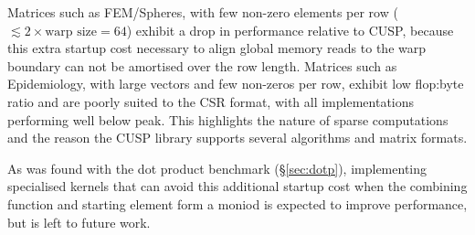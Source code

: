 %

Matrices such as FEM/Spheres, with few non-zero elements per row ($\lesssim 2
\times \text{warp size} = 64$) exhibit a drop in performance relative to CUSP,
because this extra startup cost necessary to align global memory reads to the
warp boundary can not be amortised over the row length.
%
Matrices such as Epidemiology, with large vectors and few non-zeros per row,
exhibit low flop:byte ratio and are poorly suited to the CSR format, with all
implementations performing well below peak. This highlights the nature of sparse
computations and the reason the CUSP library supports several algorithms and
matrix formats.

As was found with the dot product benchmark (\S\ref{sec:dotp}), implementing
specialised kernels that can avoid this additional startup cost when the
combining function and starting element form a moniod is expected to improve
performance, but is left to future work.

%
%

